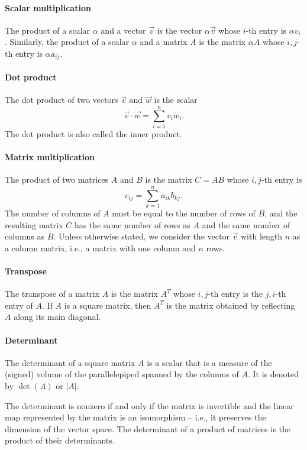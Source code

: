 \paragraph{Scalar multiplication}  The product of a scalar $\alpha$ and a vector $\vec{v}$
is the vector $\alpha \vec{v}$ whose $i$-th entry is $\alpha v_i$.  Similarly, the product of a
scalar $\alpha$ and a matrix $A$ is the matrix $\alpha A$ whose $i, j$-th entry is
$\alpha a_{ij}$.

\paragraph{Dot product}  The dot product of two vectors $\vec{v}$ and $\vec{w}$ is the
scalar $$\vec{v} \cdot \vec{w} = \sum_{i = 1}^n v_i w_i\text{.}$$  The dot product is also called
the inner product.

\paragraph{Matrix multiplication}  The product of two matrices $A$ and $B$ is the matrix
$C = A B$ whose $i, j$-th entry is $$c_{ij} = \sum_{k = 1}^n a_{ik} b_{kj}\text{.}$$
The number of columns of $A$ must be equal to the number of rows of $B$, and the
resulting matrix $C$ has the same number of rows as $A$ and the same number of columns as $B$.
Unless otherwise stated, we consider the vector $\vec{v}$ with length $n$ as a column
matrix, i.e., a matrix with one column and $n$ rows.

\paragraph{Transpose}  The transpose of a matrix $A$ is the matrix $A^T$ whose $i, j$-th
entry is the $j, i$-th entry of $A$.  If $A$ is a square matrix, then $A^T$ is the
matrix obtained by reflecting $A$ along its main diagonal.

\paragraph{Determinant}  The determinant of a square matrix $A$ is a scalar that is a
measure of the (signed) volume of the parallelepiped spanned by the columns of $A$.  It is
denoted by $\det(A)$ or $|A|$.

The determinant is nonzero if and only if the matrix is invertible and the linear map
represented by the matrix is an isomorphism -- i.e., it preserves the dimension of the
vector space.  The determinant of a product of matrices is the product of their
determinants.

